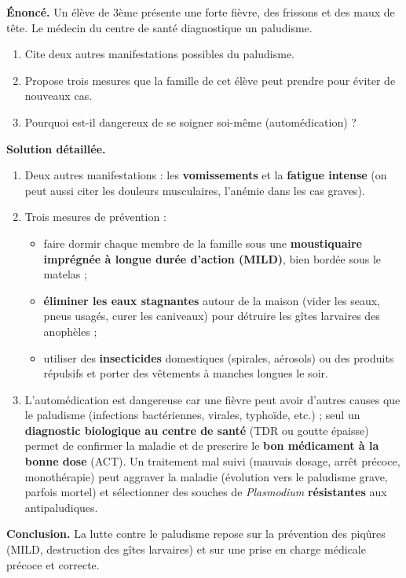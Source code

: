 \documentclass[11pt]{article}
\begin{document}
\begin{exoresolu}
\textbf{Énoncé.} Un élève de 3ème présente une forte fièvre, des frissons et des maux de tête. Le médecin du centre de santé diagnostique un paludisme.
\begin{enumerate}
\item Cite deux autres manifestations possibles du paludisme.
\item Propose trois mesures que la famille de cet élève peut prendre pour éviter de nouveaux cas.
\item Pourquoi est-il dangereux de se soigner soi-même (automédication) ?
\end{enumerate}
\tcblower
\textbf{Solution détaillée.}
\begin{enumerate}
\item Deux autres manifestations : les \textbf{vomissements} et la \textbf{fatigue intense} (on peut aussi citer les douleurs musculaires, l'anémie dans les cas graves).
\item Trois mesures de prévention :
\begin{itemize}
\item faire dormir chaque membre de la famille sous une \textbf{moustiquaire imprégnée à longue durée d'action (MILD)}, bien bordée sous le matelas ;
\item \textbf{éliminer les eaux stagnantes} autour de la maison (vider les seaux, pneus usagés, curer les caniveaux) pour détruire les gîtes larvaires des anophèles ;
\item utiliser des \textbf{insecticides} domestiques (spirales, aérosols) ou des produits répulsifs et porter des vêtements à manches longues le soir.
\end{itemize}
\item L'automédication est dangereuse car une fièvre peut avoir d'autres causes que le paludisme (infections bactériennes, virales, typhoïde, etc.) ; seul un \textbf{diagnostic biologique au centre de santé} (TDR ou goutte épaisse) permet de confirmer la maladie et de prescrire le \textbf{bon médicament à la bonne dose} (ACT). Un traitement mal suivi (mauvais dosage, arrêt précoce, monothérapie) peut aggraver la maladie (évolution vers le paludisme grave, parfois mortel) et sélectionner des souches de \emph{Plasmodium} \textbf{résistantes} aux antipaludiques.
\end{enumerate}
\textbf{Conclusion.} La lutte contre le paludisme repose sur la prévention des piqûres (MILD, destruction des gîtes larvaires) et sur une prise en charge médicale précoce et correcte.
\end{exoresolu}
\end{document}
